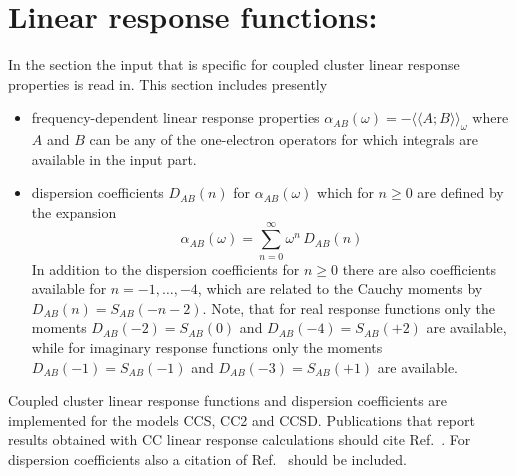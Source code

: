 
\section{Linear response functions: }\label{sec:cclr}
In the  section the input that is
specific for coupled cluster linear response properties is read in. 
This section includes presently 
\begin{itemize}
\item frequency-dependent linear response properties 
      $\alpha_{AB}(\omega)  = - \langle\langle A; B \rangle\rangle_\omega$
      where $A$ and $B$ can be any of the one-electron
      operators for which integrals are available in the 
       input part.
\item dispersion coefficients $D_{AB}(n)$ for $\alpha_{AB}(\omega)$
      which for $n \ge 0$ are defined by the expansion
      $$ \alpha_{AB}(\omega) = \sum_{n=0}^{\infty} \omega^n \, D_{AB}(n) $$
      In addition to the dispersion coefficients for $n \ge 0$
      there are also coefficients available for $ n = -1, \ldots, -4$,
      which are related to the Cauchy moments by $ D_{AB}(n) = S_{AB}(-n-2)$.
      Note, that for real response functions only the moments
      $D_{AB}(-2) = S_{AB}(0)$ and $D_{AB}(-4) = S_{AB}(+2)$ are available,
      while for imaginary response functions only the moments
      $D_{AB}(-1) = S_{AB}(-1)$ and $D_{AB}(-3) = S_{AB}(+1)$ are available.
\end{itemize}
Coupled cluster linear response functions and dispersion coefficients
are implemented for the models CCS, CC2 and CCSD. 
Publications that report results obtained with CC linear response
calculations should cite Ref.\ \cite{Christiansen:CCLR}. 
For dispersion coefficients also a citation of Ref.\ \cite{Haettig:CAUCHY} 
should be included.

